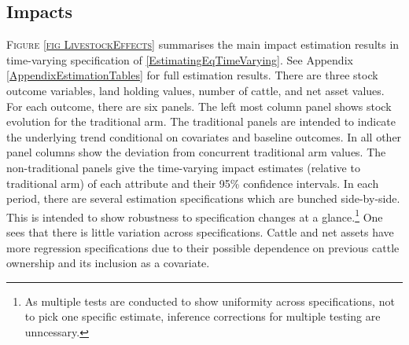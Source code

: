 \subsection{Impacts}

\begin{figure}
\end{figure}

	\textsc{\footnotesize Figure \ref{fig LivestockEffects}} summarises the main impact estimation results in time-varying specification of \eqref{EstimatingEqTimeVarying}.  See Appendix \ref{AppendixEstimationTables} for full estimation results. There are three stock outcome variables, land holding values, number of cattle, and net asset values. For each outcome, there are six panels. The left most column panel shows stock evolution for the \textsf{traditional} arm. The \textsf{traditional} panels are intended to indicate the underlying trend conditional on covariates and baseline outcomes. In all other panel columns show the deviation from concurrent \textsf{traditional} arm values. The non-\textsf{traditional} panels give the time-varying impact estimates (relative to \textsf{traditional} arm) of each attribute and their 95\% confidence intervals. In each period, there are several estimation specifications which are bunched side-by-side. This is intended to show robustness to specification changes at a glance.\footnote{As multiple tests are conducted to show uniformity across specifications, not to pick one specific estimate, inference corrections for multiple testing are unncessary. } One sees that there is little variation across specifications. Cattle and net assets have more regression specifications due to their possible dependence on previous cattle ownership and its inclusion as a covariate.
	
